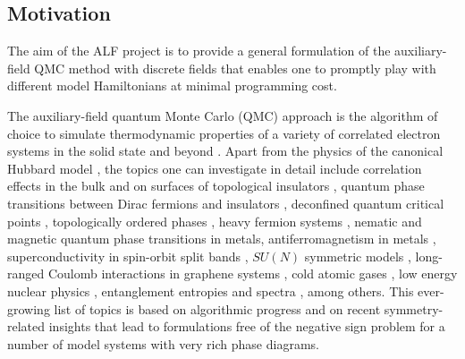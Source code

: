 



\subsection{Motivation}

The aim of the ALF project is to provide a general formulation of the auxiliary-field QMC method with discrete  fields that enables one to promptly play with different model Hamiltonians  at  minimal programming cost.

The auxiliary-field quantum Monte Carlo (QMC) approach is the algorithm of choice to simulate  thermodynamic properties of a variety of correlated electron systems in the solid state and beyond \cite{Blankenbecler81,White89,Sugiyama86,Sorella89, Duane87, Assaad08_rev}.  
Apart from the physics of the  canonical Hubbard model 
\cite{Scalapino07,LeBlanc15},   the topics one can investigate in detail include correlation effects in the bulk and on surfaces of topological insulators \cite{Hohenadler10,Zheng11}, quantum phase transitions between  Dirac fermions  and insulators \cite{Assaad13,Toldin14,Otsuka16,Chandrasekharan13,Chandrasekharan15},  
deconfined quantum critical points \cite{Li15a,Assaad16}, topologically ordered phases \cite{Assaad16}, heavy fermion systems \cite{Assaad99a,Capponi00}, nematic \cite{Schattner15} and magnetic  \cite{Xu16c} quantum phase transitions in metals, antiferromagnetism in metals \cite{Berg12},    superconductivity in spin-orbit split bands \cite{Tang14_1}, $SU(N)$ symmetric models \cite{Assaad04,Lang13},  long-ranged Coulomb interactions in graphene systems \cite{Hohenadler14,Tang15},  cold atomic gases  \cite{Rigol03},  low energy nuclear physics \cite{Lee09},  entanglement entropies and spectra \cite{Grover13,Broecker14,Assaad13a,Assaad15},  among others. 
This ever-growing list of topics is based on algorithmic progress and on recent symmetry-related insights  \cite{Wu04,Huffman14,Yao14a,Wei16} that lead to formulations free of the negative sign problem for a number of model systems with very rich phase diagrams.


